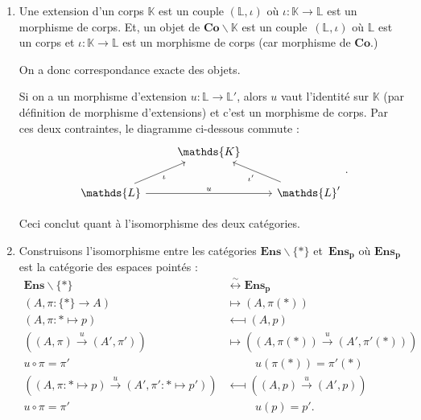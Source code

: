 \documentclass{../../td}
\begin{document}
  \begin{enumerate}
    \item Une extension d'un corps $\mathds{K}$ est un couple $(\mathds{L}, \iota)$ où $\iota : \mathds{K} \to \mathds{L}$ est un morphisme de corps.
      Et, un objet de $\mathbf{Co} \backslash \mathds{K}$ est un couple~$(\mathds{L}, \iota)$ où $\mathds{L}$ est un corps et  $\iota : \mathds{K} \to \mathds{L}$ est un morphisme de corps (car morphisme de $\mathbf{Co}$.)

      On a donc correspondance exacte des objets.

      Si on a un morphisme d'extension $u : \mathds{L} \to \mathds{L}'$, alors $u$ vaut l'identité sur $\mathds{K}$ (par définition de morphisme d'extensions) et c'est un morphisme de corps.
      Par ces deux contraintes, le diagramme ci-dessous commute :
      \[
      \begin{tikzcd}
                                                   & \mathds{K}\\
        \mathds{L} \arrow{rr}{u} \arrow[swap]{ur}{\iota} && \mathds{L}'\arrow{ul}{\iota'}
      \end{tikzcd}
      .\]
      
      Ceci conclut quant à l'isomorphisme des deux catégories.

    \item Construisons l'isomorphisme entre les catégories $\mathbf{Ens} \backslash \{*\}$ et~$\mathbf{Ens_p}$ où $\mathbf{Ens_p}$ est la catégorie des espaces pointés :
      \begin{align*}
        \mathbf{Ens} \backslash \{*\} &\overset \sim \longleftrightarrow \mathbf{Ens_p} \\
         (A, \pi : \{*\} \to A) &\longmapsto (A,  \pi(*))\\
         (A, \pi : {*} \mapsto p) &\longmapsfrom (A,  p)\\
         ((A, \pi) \overset u \to (A', \pi')) &\longmapsto ((A, \pi(*)) \overset u \to (A', \pi'(*)))\\
         u \circ \pi = \pi' & \phantom{\longmapsto} \quad u(\pi(*)) = \pi'(*)\\
         ((A, \pi : * \mapsto p) \overset u \to (A', \pi' : * \mapsto p')) &\longmapsfrom ((A, p) \overset u \to (A', p))\\
         u \circ \pi = \pi' & \phantom{\longmapsto} \quad u(p) = p'
      .\end{align*}
  \end{enumerate}
\end{document}
